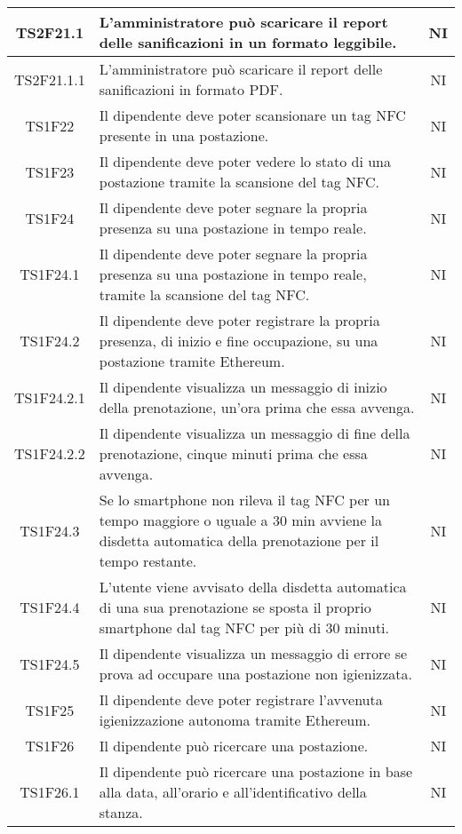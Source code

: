 \begin{center}
\begin{longtable}{|c|p{10cm}|c|}
			\hline
			TS2F21.1 & L'amministratore può scaricare il report delle sanificazioni in un formato leggibile. & NI \\	
			\hline
			TS2F21.1.1 & L'amministratore può scaricare il report delle sanificazioni in formato PDF. & NI \\	
			\hline			
			TS1F22 & Il dipendente deve poter scansionare un tag NFC presente in una postazione. & NI \\	
			\hline
			TS1F23 & Il dipendente deve poter vedere lo stato di una postazione tramite la scansione del tag NFC. & NI \\	
			\hline
			TS1F24 & Il dipendente deve poter segnare la propria presenza su una postazione in tempo reale. & NI \\	
			\hline			
			TS1F24.1 & Il dipendente deve poter segnare la propria presenza su una postazione in tempo reale, tramite la scansione del tag NFC. & NI \\	
			\hline
			TS1F24.2 & Il dipendente deve poter registrare la propria presenza, di inizio e fine occupazione, su una postazione tramite Ethereum. & NI \\	
			\hline			
			TS1F24.2.1 & Il dipendente visualizza un messaggio di inizio della prenotazione, un'ora prima che essa avvenga. & NI \\	
			\hline						
			TS1F24.2.2 & Il dipendente visualizza un messaggio di fine della prenotazione, cinque minuti prima che essa avvenga. & NI \\	
			\hline					
			TS1F24.3 & Se lo smartphone non rileva il tag NFC per un tempo maggiore o uguale a 30 min avviene la disdetta automatica della prenotazione per il tempo restante. & NI \\	
			\hline				
			TS1F24.4 & L’utente viene avvisato della disdetta automatica di una sua prenotazione se sposta il proprio smartphone dal tag NFC per più di 30 minuti. & NI \\	
			\hline				
			TS1F24.5 & Il dipendente visualizza un messaggio di errore se prova ad occupare una postazione non igienizzata. & NI \\	
			\hline
			TS1F25 & Il dipendente deve poter registrare l'avvenuta igienizzazione autonoma tramite Ethereum. & NI \\	
			\hline
			TS1F26 & Il dipendente può ricercare una postazione. & NI \\	
			\hline
			TS1F26.1 & Il dipendente può ricercare una postazione in base alla data, all'orario e all'identificativo della stanza. & NI \\	

\end{longtable}
\end{center}
